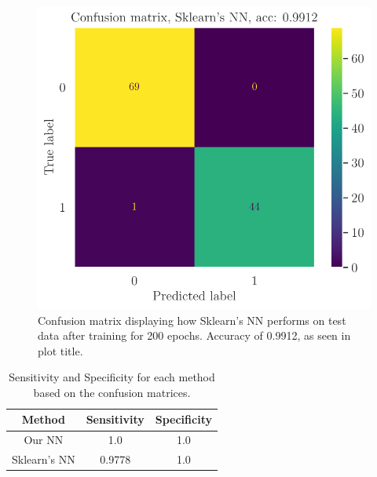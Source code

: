 \begin{figure}
    \centering
    \includegraphics[width=0.99\linewidth]{latex/figures/sklearnWBC_final_ADAM_relu6-100_sigmoid-2.pdf}
    \caption{Confusion matrix displaying how Sklearn's NN performs on test data after training for 200 epochs. Accuracy of 0.9912, as seen in plot title.}
    \label{fig:sklearns confusion matrix}
\end{figure}

\begin{table}[h!]
\centering
\begin{tabular}{ccc}
\hline
\textbf{Method} & \textbf{Sensitivity} & \textbf{Specificity} \\
\hline
Our NN          & 1.0                           & 1.0                  \\
Sklearn's NN    & 0.9778                        & 1.0                  \\
\hline
\end{tabular}
\caption{Sensitivity and Specificity for each method based on the confusion matrices.}
\label{table:sensitivity-and-specificity}
\end{table}

